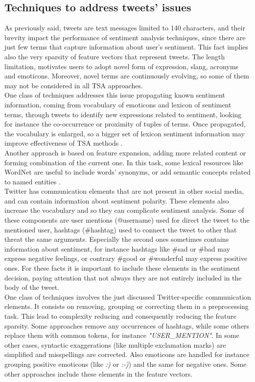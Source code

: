 \subsection{Techniques to address tweets' issues}

As previously said, tweets are text messages limited to 140 characters, and their brevity impact the performance of sentiment analysis techniques, since there are just few terms that capture information about user's sentiment. This fact implies also the very sparsity of feature vectors that represent tweets. The length limitation, motivates users to adopt novel form of expression, slang, acronyms and emoticons. Moreover, novel terms are continuously evolving, so some of them may not be considered in all \ac{TSA} approaches.\\
One class of techniques addresses this issue propagating known sentiment information, coming from vocabulary of emoticons and lexicon of sentiment terms, through tweets to identify new expressions related to sentiment, looking for instance the co-occurrence or proximity of tuples of terms. Once propagated, the vocabulary is enlarged, so a bigger set of lexicon sentiment information may improve effectiveness of \ac{TSA} methods \cite{tang-etal-2014-learning}.\\
Another approach is based on feature expansion, adding more related content or forming combination of the current one. In this task, some lexical resources like WordNet are useful to include words' synonyms, or add semantic concepts related to named entities \cite{montejo-raetz-etal-2014}.\\
Twitter has communication elements that are not present in other social media, and can contain information about sentiment polarity. These elements also increase the vocabulary and so they can complicate sentiment analysis. Some of these components are user mentions (@username) used for direct the tweet to the mentioned user, hashtags (\#hashtag) used to connect the tweet to other that threat the same arguments. Especially the second ones sometimes contains information about sentiment, for instance hashtags like \#sad or \#bad may express negative feelings, or contrary \#good or \#wonderful may express positive ones. For these facts it is important to include these elements in the sentiment decision, paying attention that not always they are not entirely included in the body of the tweet.\\
One class of techniques involves the just discussed Twitter-specific communication elements. It consists on removing, grouping or correcting them in a preprocessing task. This lead to complexity reducing and consequently reducing the feature sparsity. Some approaches remove any occurrences of hashtags, while some others replace them with common tokens, for instance \textit{"USER\_MENTION"}. In some other cases, syntactic exaggerations (like multiple exclamation marks) are simplified and misspellings are corrected. Also emoticons are handled for instance grouping positive emoticons (like \textit{:)} or \textit{:-)}) and the same for negative ones. Some other approaches include these elements in the feature vectors.\\

